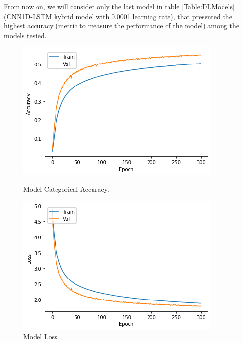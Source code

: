 From now on, we will consider only the last model in table \ref{Table:DLModels} (CNN1D-LSTM hybrid model with 0.0001 learning rate), that presented the highest accuracy (metric to measure the performance of the model) among the models tested. 

\begin{figure}[!tbp]
  \centering
  \begin{minipage}[b]{0.45\textwidth}
    \includegraphics[width=\textwidth]{../Figures/accuracy_model}
    \caption{Model Categorical Accuracy.}
    \label{Fig:Model_Cat_Acc}
  \end{minipage}
  \hfill
  \begin{minipage}[b]{0.45\textwidth}
    \includegraphics[width=\textwidth]{../Figures/loss_model}
    \caption{Model Loss.}
    \label{Fig:Model_Loss}
  \end{minipage}
\end{figure}

